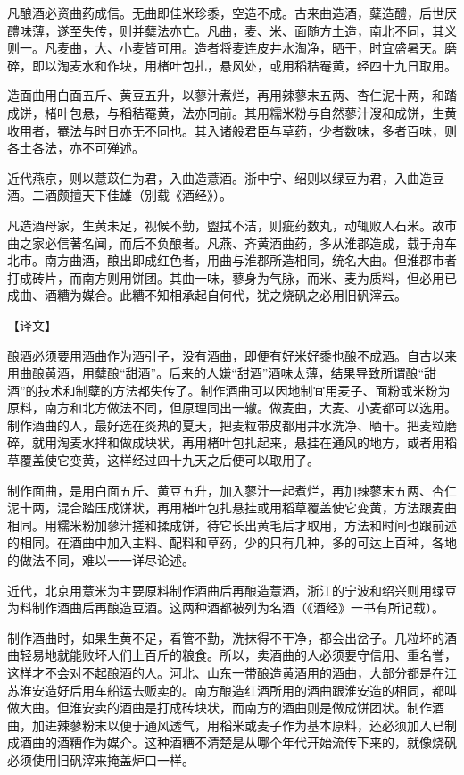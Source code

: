 \documentclass[12pt,UTF8]{ctexbook}
\begin{document}
凡酿酒必资曲药成信。无曲即佳米珍黍，空造不成。古来曲造酒，糵造醴，后世厌醴味薄，遂至失传，则并糵法亦亡。凡曲，麦、米、面随方土造，南北不同，其义则一。凡麦曲，大、小麦皆可用。造者将麦连皮井水淘净，晒干，时宜盛暑天。磨碎，即以淘麦水和作块，用楮叶包扎，悬风处，或用稻秸罨黄，经四十九日取用。

造面曲用白面五斤、黄豆五升，以蓼汁煮烂，再用辣蓼末五两、杏仁泥十两，和踏成饼，楮叶包悬，与稻秸罨黄，法亦同前。其用糯米粉与自然蓼汁溲和成饼，生黄收用者，罨法与时日亦无不同也。其入诸般君臣与草药，少者数味，多者百味，则各土各法，亦不可殚述。

近代燕京，则以薏苡仁为君，入曲造薏酒。浙中宁、绍则以绿豆为君，入曲造豆酒。二酒颇擅天下佳雄（别载《酒经》）。

凡造酒母家，生黄未足，视候不勤，盥拭不洁，则疵药数丸，动辄败人石米。故市曲之家必信著名闻，而后不负酿者。凡燕、齐黄酒曲药，多从淮郡造成，载于舟车北市。南方曲酒，酿出即成红色者，用曲与淮郡所造相同，统名大曲。但淮郡市者打成砖片，而南方则用饼团。其曲一味，蓼身为气脉，而米、麦为质料，但必用已成曲、酒糟为媒合。此糟不知相承起自何代，犹之烧矾之必用旧矾滓云。

【译文】

酿酒必须要用酒曲作为酒引子，没有酒曲，即便有好米好黍也酿不成酒。自古以来用曲酿黄酒，用糵酿“甜酒”。后来的人嫌“甜酒”酒味太薄，结果导致所谓酿“甜酒”的技术和制糵的方法都失传了。制作酒曲可以因地制宜用麦子、面粉或米粉为原料，南方和北方做法不同，但原理同出一辙。做麦曲，大麦、小麦都可以选用。制作酒曲的人，最好选在炎热的夏天，把麦粒带皮都用井水洗净、晒干。把麦粒磨碎，就用淘麦水拌和做成块状，再用楮叶包扎起来，悬挂在通风的地方，或者用稻草覆盖使它变黄，这样经过四十九天之后便可以取用了。

制作面曲，是用白面五斤、黄豆五升，加入蓼汁一起煮烂，再加辣蓼末五两、杏仁泥十两，混合踏压成饼状，再用楮叶包扎悬挂或用稻草覆盖使它变黄，方法跟麦曲相同。用糯米粉加蓼汁搓和揉成饼，待它长出黄毛后才取用，方法和时间也跟前述的相同。在酒曲中加入主料、配料和草药，少的只有几种，多的可达上百种，各地的做法不同，难以一一详尽论述。

近代，北京用薏米为主要原料制作酒曲后再酿造薏酒，浙江的宁波和绍兴则用绿豆为料制作酒曲后再酿造豆酒。这两种酒都被列为名酒（《酒经》一书有所记载）。

制作酒曲时，如果生黄不足，看管不勤，洗抹得不干净，都会出岔子。几粒坏的酒曲轻易地就能败坏人们上百斤的粮食。所以，卖酒曲的人必须要守信用、重名誉，这样才不会对不起酿酒的人。河北、山东一带酿造黄酒用的酒曲，大部分都是在江苏淮安造好后用车船运去贩卖的。南方酿造红酒所用的酒曲跟淮安造的相同，都叫做大曲。但淮安卖的酒曲是打成砖块状，而南方的酒曲则是做成饼团状。制作酒曲，加进辣蓼粉末以便于通风透气，用稻米或麦子作为基本原料，还必须加入已制成酒曲的酒糟作为媒介。这种酒糟不清楚是从哪个年代开始流传下来的，就像烧矾必须使用旧矾滓来掩盖炉口一样。
\end{document}
